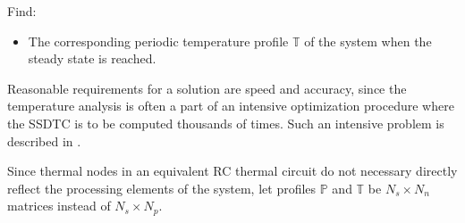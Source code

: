 Find:
\begin{itemize}
  \item The corresponding periodic temperature profile $\mathbb{T}$ of the system when the steady state is reached.
\end{itemize}

Reasonable requirements for a solution are speed and accuracy, since the temperature analysis is often a part of an intensive optimization procedure where the SSDTC is to be computed thousands of times. Such an intensive problem is described in .

Since thermal nodes in an equivalent RC thermal circuit do not necessary directly reflect the processing elements of the system, let profiles $\mathbb{P}$ and $\mathbb{T}$ be $N_s \times N_n$ matrices instead of $N_s \times N_p$.
